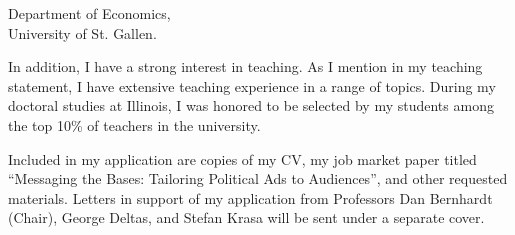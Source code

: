 \documentclass[12pt]{letter}
\begin{document}
\begin{letter}{Department of Economics,\\
University of St. Gallen.}




In addition, I have a strong interest in teaching.
As I mention in my teaching statement, I have extensive teaching experience in a range of topics.
During my doctoral studies at Illinois, I was honored to be selected by my students among the top 10\% of teachers in the university.





Included in my application are copies of my CV, my job market paper titled ``Messaging the Bases: Tailoring Political Ads to Audiences'',
and other requested materials.
Letters in support of my application from Professors Dan Bernhardt (Chair), George Deltas, and Stefan Krasa will be sent under a separate cover. 


\end{letter}
\end{document}
